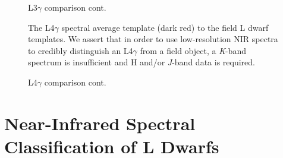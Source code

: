 \documentclass[12pt]{aastex6}
\begin{document}
\begin{figure}
     \caption{L3$\gamma$ comparison cont.}
\end{figure}

\begin{figure}
    \caption{The L4$\gamma$ spectral average template (dark red) to the field L dwarf templates.
    We assert that in order to use low-resolution NIR spectra to credibly distinguish an L4$\gamma$ from a field object, a \emph{K}-band spectrum is insufficient and H and/or \emph{J}-band data is required.}
    \label{fig:L4lg-field}
\end{figure}

\begin{figure}
     \caption{L4$\gamma$ comparison cont.}
\end{figure}

\section{Near-Infrared Spectral Classification of L Dwarfs}
\label{sec:classification}
\end{document}
